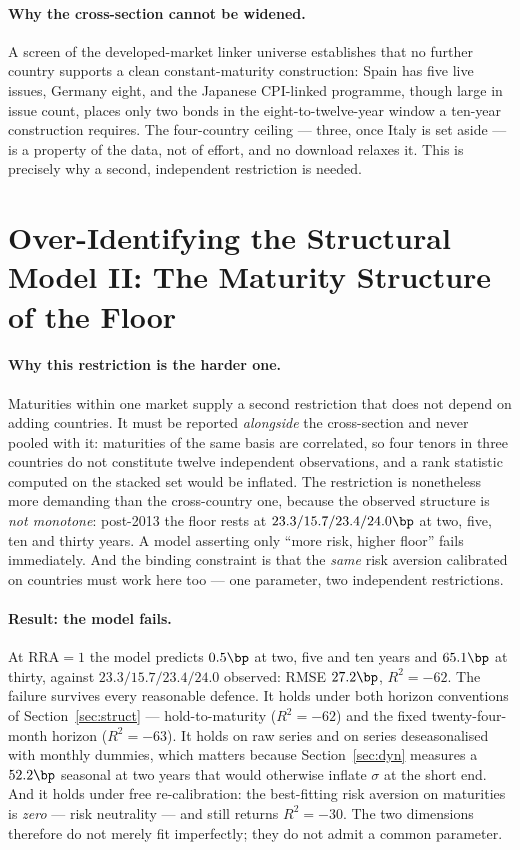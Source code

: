\documentclass[11pt]{article}
\begin{document}
\paragraph{Why the cross-section cannot be widened.} A screen of the developed-market linker
universe establishes that no further country supports a clean constant-maturity construction: Spain
has five live issues, Germany eight, and the Japanese CPI-linked programme, though large in issue
count, places only two bonds in the eight-to-twelve-year window a ten-year construction requires.
The four-country ceiling --- three, once Italy is set aside --- is a property of the data, not of
effort, and no download relaxes it. This is precisely why a second, independent restriction is
needed.

\section{Over-Identifying the Structural Model II: The Maturity Structure of the Floor}\label{sec:floorterm}

\paragraph{Why this restriction is the harder one.} Maturities within one market supply a second
restriction that does not depend on adding countries. It must be reported \emph{alongside} the
cross-section and never pooled with it: maturities of the same basis are correlated, so four tenors
in three countries do not constitute twelve independent observations, and a rank statistic computed
on the stacked set would be inflated. The restriction is nonetheless more demanding than the
cross-country one, because the observed structure is \emph{not monotone}: post-2013 the floor rests
at $23.3/15.7/23.4/24.0\bp$ at two, five, ten and thirty years. A model asserting only ``more risk,
higher floor'' fails immediately. And the binding constraint is that the \emph{same} risk aversion
calibrated on countries must work here too --- one parameter, two independent restrictions.

\paragraph{Result: the model fails.} At $\mathrm{RRA}=1$ the model predicts $0.5\bp$ at two, five
and ten years and $65.1\bp$ at thirty, against $23.3/15.7/23.4/24.0$ observed: RMSE $27.2\bp$,
$R^{2}=-62$. The failure survives every reasonable defence. It holds under both horizon conventions
of Section~\ref{sec:struct} --- hold-to-maturity ($R^{2}=-62$) and the fixed twenty-four-month
horizon ($R^{2}=-63$). It holds on raw series and on series deseasonalised with monthly dummies,
which matters because Section~\ref{sec:dyn} measures a $52.2\bp$ seasonal at two years that would
otherwise inflate $\sigma$ at the short end. And it holds under free re-calibration: the
best-fitting risk aversion on maturities is \emph{zero} --- risk neutrality --- and still returns
$R^{2}=-30$. The two dimensions therefore do not merely fit imperfectly; they do not admit a common
parameter.
\end{document}
